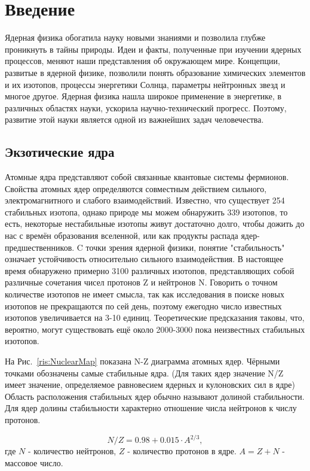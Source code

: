 \section{Введение}

Ядерная физика обогатила науку новыми знаниями и позволила глубже проникнуть в тайны природы. Идеи и факты, полученные при изучении ядерных процессов, меняют наши представления об окружающем мире. Концепции, развитые в ядерной физике, позволили понять образование химических элементов и их изотопов, процессы энергетики Солнца, параметры нейтронных звезд и многое другое. Ядерная физика нашла широкое применение в энергетике, в различных областях науки, ускорила научно-технический прогресс. Поэтому, развитие этой науки является одной из важнейших задач человечества.

\subsection{Экзотические ядра}

Атомные ядра представляют собой связанные квантовые системы фермионов. Свойства атомных ядер определяются совместным действием сильного, электромагнитного и слабого взаимодействий. Известно, что существует 254 стабильных изотопа, однако природе мы можем обнаружить 339 изотопов\cite{ufn}, то есть, некоторые нестабильные изотопы живут достаточно долго, чтобы дожить до нас с времён образования вселенной, или как продукты распада ядер-предшественников. C точки зрения ядерной физики, понятие "стабильность" означает устойчивость относительно сильного взаимодействия. В настоящее время обнаружено примерно 3100 различных изотопов\cite{ufn}, представляющих собой различные сочетания чисел протонов Z и нейтронов N. Говорить о точном количестве изотопов не имеет смысла, так как исследования в поиске новых изотопов не прекращаются по сей день, поэтому ежегодно число известных изотопов увеличивается на 3-10 единиц. Теоретические предсказания таковы, что, вероятно, могут существовать ещё около 2000-3000 пока неизвестных стабильных изотопов\cite{ufn}. 

На Рис.~\ref{ris:NuclearMap} показана N-Z диаграмма атомных ядер. Чёрными точками обозначены самые стабильные ядра. (Для таких ядер  значение N/Z имеет значение, определяемое равновесием ядерных и кулоновских сил в ядре) Область расположения стабильных ядер обычно называют долиной стабильности. Для ядер долины стабильности характерно отношение числа нейтронов к числу протонов.

$$N/Z = 0.98 + 0.015 \cdot A^{2/3},$$
где $N$ - количество нейтронов, $Z$ - количество протонов в ядре. $A = Z + N$ - массовое число\cite{inet}.

